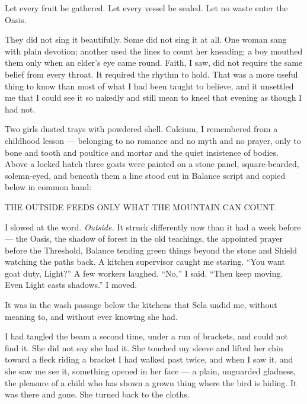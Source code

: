 \begin{scripture}
Let every fruit be gathered. Let every vessel be sealed. Let no waste enter the Oasis.
\end{scripture}

They did not sing it beautifully. Some did not sing it at all. One woman sang with plain devotion; another used the lines to count her kneading; a boy mouthed them only when an elder's eye came round. Faith, I saw, did not require the same belief from every throat. It required the rhythm to hold. That was a more useful thing to know than most of what I had been taught to believe, and it unsettled me that I could see it so nakedly and still mean to kneel that evening as though I had not.\par

Two girls dusted trays with powdered shell. Calcium, I remembered from a childhood lesson --- belonging to no romance and no myth and no prayer, only to bone and tooth and poultice and mortar and the quiet insistence of bodies. Above a locked hatch three goats were painted on a stone panel, square-bearded, solemn-eyed, and beneath them a line stood cut in Balance script and copied below in common hand:\par

\begin{scripture}
THE OUTSIDE FEEDS ONLY WHAT THE MOUNTAIN CAN COUNT.
\end{scripture}

I slowed at the word. \textit{Outside.} It struck differently now than it had a week before --- the Oasis, the shadow of forest in the old teachings, the appointed prayer before the Threshold, Balance tending green things beyond the stone and Shield watching the paths back. A kitchen supervisor caught me staring. ``You want goat duty, Light?'' A few workers laughed. ``No,'' I said. ``Then keep moving. Even Light casts shadows.'' I moved.\par

\ornament

\noindent It was in the wash passage below the kitchens that Sela undid me, without meaning to, and without ever knowing she had.\par

I had tangled the beam a second time, under a run of brackets, and could not find it. She did not say she had it. She touched my sleeve and lifted her chin toward a fleck riding a bracket I had walked past twice, and when I saw it, and she saw me see it, something opened in her face --- a plain, unguarded gladness, the pleasure of a child who has shown a grown thing where the bird is hiding. It was there and gone. She turned back to the cloths.\par

